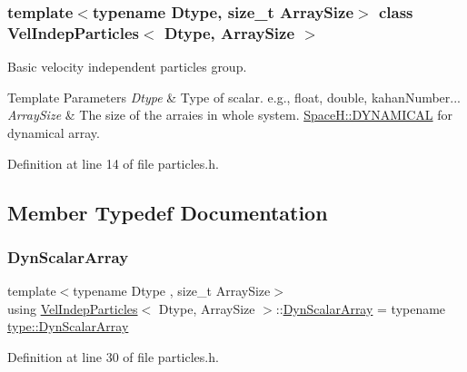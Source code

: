 \subsubsection*{template$<$typename Dtype, size\+\_\+t Array\+Size$>$\newline
class Vel\+Indep\+Particles$<$ Dtype, Array\+Size $>$}

Basic velocity independent particles group. 


\begin{DoxyTemplParams}{Template Parameters}
{\em Dtype} & Type of scalar. e.\+g., float, double, kahan\+Number... \\
\hline
{\em Array\+Size} & The size of the arraies in whole system. \mbox{\hyperlink{namespace_space_h_a3e55b9bc2a9e10c08ce8121bce11244a}{Space\+H\+::\+D\+Y\+N\+A\+M\+I\+C\+AL}} for dynamical array. \\
\hline
\end{DoxyTemplParams}


Definition at line 14 of file particles.\+h.



\subsection{Member Typedef Documentation}
\mbox{\label{class_vel_indep_particles_a6bba8ac3f941a144214037a27ccaa119}} 
\subsubsection{\texorpdfstring{Dyn\+Scalar\+Array}{DynScalarArray}}
{\footnotesize\ttfamily template$<$typename Dtype , size\+\_\+t Array\+Size$>$ \\
using \mbox{\hyperlink{class_vel_indep_particles}{Vel\+Indep\+Particles}}$<$ Dtype, Array\+Size $>$\+::\mbox{\hyperlink{class_vel_indep_particles_a6bba8ac3f941a144214037a27ccaa119}{Dyn\+Scalar\+Array}} =  typename \mbox{\hyperlink{struct_space_h_1_1_proto_type_a8f3813f576517856e0ed74af9e5ffcb4}{type\+::\+Dyn\+Scalar\+Array}}}



Definition at line 30 of file particles.\+h.

\mbox{\label{class_vel_indep_particles_a5e4f20d435c71a5f4179143206258a81}} 
